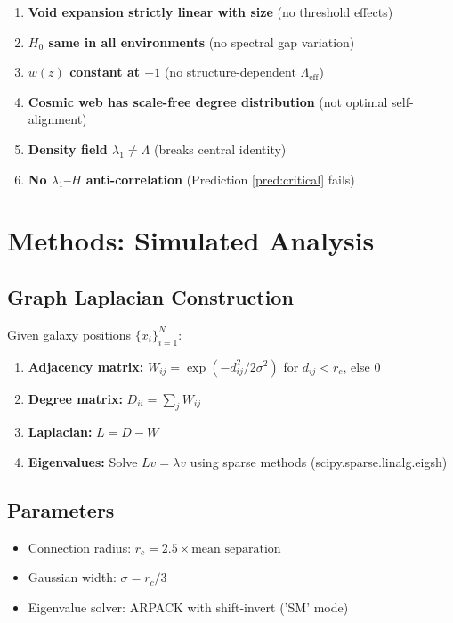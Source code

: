 \documentclass[11pt,a4paper]{article}
\theoremstyle{plain}
\theoremstyle{definition}
\theoremstyle{remark}
\begin{document}
\begin{enumerate}
    \item \textbf{Void expansion strictly linear with size} (no threshold effects)
    \item \textbf{$H_0$ same in all environments} (no spectral gap variation)
    \item \textbf{$w(z)$ constant at $-1$} (no structure-dependent $\Lambda_{\text{eff}}$)
    \item \textbf{Cosmic web has scale-free degree distribution} (not optimal self-alignment)
    \item \textbf{Density field $\lambda_1 \neq \Lambda$} (breaks central identity)
    \item \textbf{No $\lambda_1$--$H$ anti-correlation} (Prediction \ref{pred:critical} fails)
\end{enumerate}

\section{Methods: Simulated Analysis}
\label{sec:methods}

\subsection{Graph Laplacian Construction}

Given galaxy positions $\{x_i\}_{i=1}^N$:

\begin{enumerate}[noitemsep]
    \item \textbf{Adjacency matrix:} $W_{ij} = \exp(-d_{ij}^2/2\sigma^2)$ for $d_{ij} < r_c$, else 0
    \item \textbf{Degree matrix:} $D_{ii} = \sum_j W_{ij}$
    \item \textbf{Laplacian:} $L = D - W$
    \item \textbf{Eigenvalues:} Solve $Lv = \lambda v$ using sparse methods (scipy.sparse.linalg.eigsh)
\end{enumerate}

\subsection{Parameters}

\begin{itemize}[noitemsep]
    \item Connection radius: $r_c = 2.5 \times \text{mean separation}$
    \item Gaussian width: $\sigma = r_c/3$
    \item Eigenvalue solver: ARPACK with shift-invert ('SM' mode)
\end{itemize}
\end{document}
